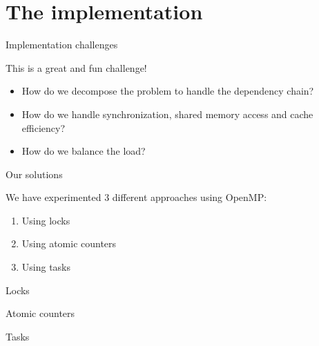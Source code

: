 
\section{The implementation}


   

    \begin{frame}{Implementation challenges}
    \begin{center}
        This is a great and fun challenge!
    \end{center}
        
        \begin{itemize}
            
            \item How do we decompose the problem to handle the dependency chain?
            \item How do we handle synchronization, shared memory access and cache efficiency?
            \item How do we balance the load?
           
        \end{itemize}
    \end{frame}


    

    \begin{frame}{Our solutions}

        We have experimented 3 different approaches using OpenMP:

        \begin{enumerate}
            \item Using locks
            \item Using atomic counters
            \item Using tasks
        \end{enumerate}
        
    \end{frame}



    \begin{frame}{Locks}
        
    \end{frame}



    \begin{frame}{Atomic counters}
        
    \end{frame}



    \begin{frame}{Tasks}
        
    \end{frame}